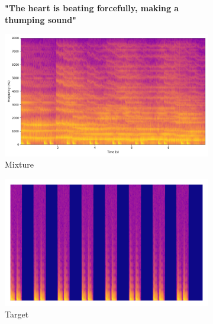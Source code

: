 \begin{figure}[htbp]
     \begin{subfigure}[b]{0.18\textwidth}
        \centering
        \scriptsize\textbf{"The heart is beating forcefully, making a thumping sound"}
        \vspace{5.0mm}
    \end{subfigure}
    \begin{subfigure}[b]{0.18\textwidth}
        \centering
        \includegraphics[width=\textwidth]{plots/onepeace_best_sdr/onepeace mixture_spectrogram.png}
        \centering
        \caption*{Mixture}
    \end{subfigure}
     \begin{subfigure}[b]{0.18\textwidth}
        \centering
        \includegraphics[width=\textwidth]{plots/onepeace_best_sdr/onepeace target_spectrogram.png}
        \caption*{Target}
    \end{subfigure}
    \begin{subfigure}[b]{0.18\textwidth}
        \centering

\end{subfigure}
\end{figure}
